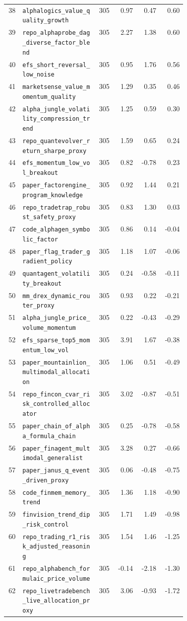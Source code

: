 \begin{scriptsize}
\begin{longtable}{r>{\raggedright\arraybackslash}p{0.42\linewidth}rrrr}
38 & \nolinkurl{alphalogics_value_quality_growth} & 305 & 0.97 & 0.47 & 0.60\\
39 & \nolinkurl{repo_alphaprobe_dag_diverse_factor_blend} & 305 & 2.27 & 1.38 & 0.60\\
40 & \nolinkurl{efs_short_reversal_low_noise} & 305 & 0.95 & 1.76 & 0.56\\
41 & \nolinkurl{marketsense_value_momentum_quality} & 305 & 1.29 & 0.35 & 0.46\\
42 & \nolinkurl{alpha_jungle_volatility_compression_trend} & 305 & 1.25 & 0.59 & 0.30\\
43 & \nolinkurl{repo_quantevolver_return_sharpe_proxy} & 305 & 1.59 & 0.65 & 0.24\\
44 & \nolinkurl{efs_momentum_low_vol_breakout} & 305 & 0.82 & -0.78 & 0.23\\
45 & \nolinkurl{paper_factorengine_program_knowledge} & 305 & 0.92 & 1.44 & 0.21\\
46 & \nolinkurl{repo_tradetrap_robust_safety_proxy} & 305 & 0.83 & 1.30 & 0.03\\
47 & \nolinkurl{code_alphagen_symbolic_factor} & 305 & 0.86 & 0.14 & -0.04\\
48 & \nolinkurl{paper_flag_trader_gradient_policy} & 305 & 1.18 & 1.07 & -0.06\\
49 & \nolinkurl{quantagent_volatility_breakout} & 305 & 0.24 & -0.58 & -0.11\\
50 & \nolinkurl{mm_drex_dynamic_router_proxy} & 305 & 0.93 & 0.22 & -0.21\\
51 & \nolinkurl{alpha_jungle_price_volume_momentum} & 305 & 0.22 & -0.43 & -0.29\\
52 & \nolinkurl{efs_sparse_top5_momentum_low_vol} & 305 & 3.91 & 1.67 & -0.38\\
53 & \nolinkurl{paper_mountainlion_multimodal_allocation} & 305 & 1.06 & 0.51 & -0.49\\
54 & \nolinkurl{repo_fincon_cvar_risk_controlled_allocator} & 305 & 3.02 & -0.87 & -0.51\\
55 & \nolinkurl{paper_chain_of_alpha_formula_chain} & 305 & 0.25 & -0.78 & -0.58\\
56 & \nolinkurl{paper_finagent_multimodal_generalist} & 305 & 3.28 & 0.27 & -0.66\\
57 & \nolinkurl{paper_janus_q_event_driven_proxy} & 305 & 0.06 & -0.48 & -0.75\\
58 & \nolinkurl{code_finmem_memory_trend} & 305 & 1.36 & 1.18 & -0.90\\
59 & \nolinkurl{finvision_trend_dip_risk_control} & 305 & 1.71 & 1.49 & -0.98\\
60 & \nolinkurl{repo_trading_r1_risk_adjusted_reasoning} & 305 & 1.54 & 1.46 & -1.25\\
61 & \nolinkurl{repo_alphabench_formulaic_price_volume} & 305 & -0.14 & -2.18 & -1.30\\
62 & \nolinkurl{repo_livetradebench_live_allocation_proxy} & 305 & 3.06 & -0.93 & -1.72\\
\bottomrule
\end{longtable}
\end{scriptsize}
